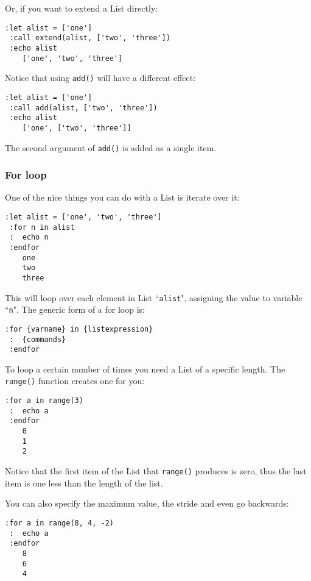 Or, if you want to extend a List directly:

\begin{Verbatim}[samepage=true]
 :let alist = ['one']
 :call extend(alist, ['two', 'three'])
 :echo alist
    ['one', 'two', 'three']
\end{Verbatim}

Notice that using \texttt{add()} will have a different effect:

\begin{Verbatim}[samepage=true]
 :let alist = ['one']
 :call add(alist, ['two', 'three'])
 :echo alist
    ['one', ['two', 'three']]
\end{Verbatim}

The second argument of \texttt{add()} is added as a single item.
\subsubsection{For loop}
One of the nice things you can do with a List is iterate over it:

\begin{Verbatim}[samepage=true]
 :let alist = ['one', 'two', 'three']
 :for n in alist
 :  echo n
 :endfor
    one
    two
    three
\end{Verbatim}

This will loop over each element in List ``\texttt{alist}", assigning the value to variable ``\texttt{n}".
The generic form of a for loop is:

\begin{Verbatim}[samepage=true]
 :for {varname} in {listexpression}
 :  {commands}
 :endfor
\end{Verbatim}

To loop a certain number of times you need a List of a specific length.
The \texttt{range()} function creates one for you:

\begin{Verbatim}[samepage=true]
 :for a in range(3)
 :  echo a
 :endfor
    0
    1
    2
\end{Verbatim}

Notice that the first item of the List that \texttt{range()} produces is zero, thus the last item is one less than the length of the list.

You can also specify the maximum value, the stride and even go backwards:

\begin{Verbatim}[samepage=true]
 :for a in range(8, 4, -2)
 :  echo a
 :endfor
    8
    6
    4
\end{Verbatim}

